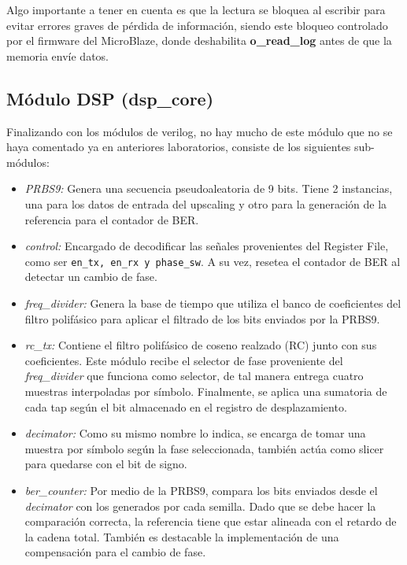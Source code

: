 \documentclass[12pt, a4paper]{article}
\begin{document}
        Algo importante a tener en cuenta es que la lectura se bloquea al escribir para evitar errores graves de pérdida de información, siendo este bloqueo controlado por el firmware del MicroBlaze,
        donde deshabilita \textbf{o\_read\_log} antes de que la memoria envíe datos.
    \subsection{Módulo DSP (dsp\_core)}
        Finalizando con los módulos de verilog, no hay mucho de este módulo que no se haya comentado ya en anteriores laboratorios, consiste de los siguientes sub-módulos:
        \begin{itemize}
            \item \textit{PRBS9:} Genera una secuencia pseudoaleatoria de 9 bits. Tiene 2 instancias, una para los datos de entrada del upscaling y otro para
            la generación de la referencia para el contador de BER.
            \item \textit{control:} Encargado de decodificar las señales provenientes del Register File, como ser \texttt{en\_tx, en\_rx y phase\_sw}. A su vez, resetea
            el contador de BER al detectar un cambio de fase.
            \item \textit{freq\_divider:} Genera la base de tiempo que utiliza el banco de coeficientes del filtro polifásico para aplicar el filtrado de los bits enviados
            por la PRBS9.
            \item \textit{rc\_tx:} Contiene el filtro polifásico de coseno realzado (RC) junto con sus coeficientes. Este módulo recibe el selector de fase proveniente del \textit{freq\_divider} que
            funciona como selector, de tal manera entrega cuatro muestras interpoladas por símbolo. Finalmente, se  aplica una sumatoria de cada tap según el bit almacenado en el registro de desplazamiento.
            \item \textit{decimator:} Como su mismo nombre lo indica, se encarga de tomar una muestra por símbolo según la fase seleccionada, también actúa como slicer para quedarse con el bit de signo.
            \item \textit{ber\_counter:} Por medio de la PRBS9, compara los bits enviados desde el \textit{decimator} con los generados por cada semilla. Dado que se debe hacer la comparación correcta, la referencia tiene que estar alineada
            con el retardo de la cadena total. También es destacable la implementación de una compensación para el cambio de fase.
        \end{itemize}
\end{document}
